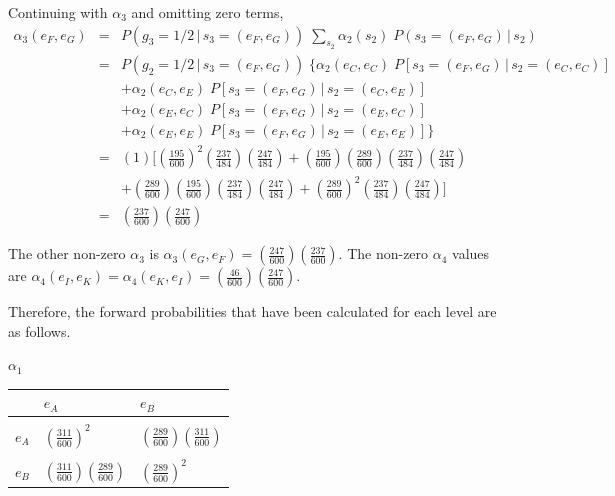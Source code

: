 \documentclass[a4paper,11pt,twoside,abstraction,titlepage]{article}
\begin{document}
\vspace{10pt}
\noindent Continuing with $\alpha_3$ and omitting zero terms,
\begin{eqnarray*}
\alpha_3(e_F,e_G) &=& P(g_3=1/2\,|\,s_3=(e_F,e_G)) \; \sum\limits_{s_2} \alpha_2(s_2) \; P(s_3=(e_F,e_G)\,|\,s_2) \\
&=& P(g_2=1/2\,|\,s_3=(e_F,e_G)) \;  \{ \alpha_2(e_C,e_C) \; P[s_3=(e_F,e_G) \,  | \, s_2 = (e_C,e_C)]  \\
&&+  \alpha_2(e_C,e_E) \; P[s_3=(e_F,e_G) \,  | \, s_2 = (e_C,e_E)]\\
&&+ \alpha_2(e_E,e_C) \; P[s_3=(e_F,e_G) \,  | \, s_2 = (e_E,e_C)]\\
&&+\alpha_2(e_E,e_E)\; P[s_3=(e_F,e_G) \,  | \, s_2 = (e_E,e_E)] \} \\
&=& (1)[\left( \frac{195}{600} \right)^2 \!\! \left(\frac{237}{484}\right) \!\! \left(\frac{247}{484}\right) +  \left( \frac{195}{600} \right) \!\! \left(\frac{289}{600}\right) \!\! \left(\frac{237}{484}\right)\!\! \left(\frac{247}{484}\right)\\
&& + \left( \frac{289}{600} \right) \!\! \left(\frac{195}{600}\right) \!\! \left(\frac{237}{484}\right)\!\! \left(\frac{247}{484}\right) + \left( \frac{289}{600} \right)^2 \!\! \left(\frac{237}{484}\right) \!\! \left(\frac{247}{484}\right) ]\\
&=&  \left( \frac{237}{600} \right) \!\! \left( \frac{247}{600} \right)
\end{eqnarray*}

\noindent The other non-zero $\alpha_3$ is $\alpha_3(e_G,e_F) = \left( \frac{247}{600} \right) \!\! \left( \frac{237}{600} \right)$.  The non-zero $\alpha_4$ values are $\alpha_4(e_I,e_K) = \alpha_4(e_K,e_I) = \left( \frac{46}{600} \right) \!\! \left( \frac{247}{600} \right)$.

Therefore, the forward probabilities that have been calculated for each level are as follows.

\vspace{15pt}

\noindent $\alpha_1$
\begin{center}
\begin{tabular}{ c | >{\centering\arraybackslash}m{1.6cm} >{\centering\arraybackslash}m{1.6cm} }
 & $e_A$ & $e_B$\\[5pt]
\hline \\[-5pt]
$e_A$ & $\left(\frac{311}{600}\right)^2$ & $\left(\frac{289}{600}\right) \!\!\left(\frac{311}{600}\right)$ \\ \\[-5pt]
$e_B$ & $\left(\frac{311}{600}\right) \!\!\left(\frac{289}{600}\right)$ &$ \left(\frac{289}{600}\right)^2 $ \\[5pt]
\end{tabular}
\end{center}
\end{document}
